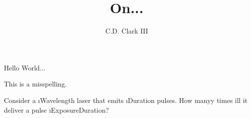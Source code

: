 \documentclass[]{}
\author{C.D. Clark III}
\title{On...}
\begin{document}
\maketitle
Hello World...

This is a misspelling.

Consider a \i{Wavelength} laser that emits \i{Duration} pulses. How manyy times ill it deliver a pulse \i{ExposureDuration}?
\end{document}
